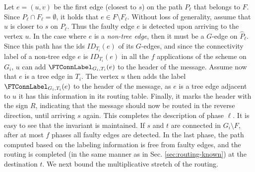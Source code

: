 Let $e=(u,v)$ be the first edge (closest to $s$) on the path $P_\ell$ that belongs to $F$. Since $P_\ell \cap F_\ell=\emptyset$, it holds that $e \in F \setminus F_\ell$. Without loss of generality, assume that $u$ is closer to $s$ on $P_\ell$. Thus the faulty edge $e$ is detected upon arriving to the vertex $u$. 
In the case where $e$ is a \emph{non-tree edge}, then it must be a $G$-edge on $\widehat{P}_\ell$. Since this path has the ids $ID_{T_i}(e)$ of its $G$-edges, and since the connectivity label of a non-tree edge $e$ is $ID_{T_i}(e)$ in all the $f$ applications of the scheme on $G_i$, $u$ can add $\FTConnLabel_{G_i,T_i}(e)$ to the header of the message.  Assume now that $e$ is a tree edge in $T_i$. The vertex $u$ then adds the label $\FTConnLabel_{G_i,T_i}(e)$ to the header of the message, as $e$ is a tree edge adjacent to $u$ it has this information in its routing table. Finally, it marks the header with the sign $R$, indicating that the message should now be routed in the reverse direction, until arriving $s$ again. This completes the description of phase $\ell$. It is easy to see that the invariant is maintained. If $s$ and $t$ are connected in $G_i \setminus F$, after at most $f$ phases all faulty edges are detected. In the last phase, the path computed based on the labeling information is free from faulty edges, and the routing is completed (in the same manner as in Sec. \ref{sec:routing-known}) at the destination $t$. We next bound the multiplicative stretch of the routing.


